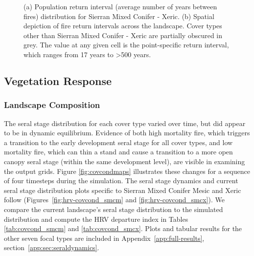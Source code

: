 \begin{figure}[!htbp]
  \centering
  \caption{(a) Population return interval (average number of years between fires) distribution for Sierran Mixed Conifer - Xeric.  (b) Spatial depiction of fire return intervals across the landscape. Cover types other than Sierran Mixed Conifer - Xeric are partially obscured in grey. The value at any given cell is the point-specific return interval, which ranges from 17 years to \textgreater 500 years.}
\label{fig:preturn_smcx}
\end{figure}

\clearpage



\subsection{Vegetation Response}
\label{subsec:HRVvegresponse}


\subsubsection{Landscape Composition} 

The seral stage distribution for each cover type varied over time, but did appear to be in dynamic equilibrium. Evidence of both high mortality fire, which triggers a transition to the early development seral stage for all cover types, and low mortality fire, which can thin a stand and cause a transition to a more open canopy seral stage (within the same development level), are visible in examining the output grids. Figure \ref{fig:covcondmaps} illustrates these changes for a sequence of four timesteps during the simulation. The seral stage dynamics and current seral stage distribution plots specific to Sierran Mixed Conifer Mesic and Xeric follow (Figures~\ref{fig:hrv-covcond_smcm} and \ref{fig:hrv-covcond_smcx}). We compare the current landscape's seral stage distribution to the simulated distribution and compute the HRV departure index in Tables \ref{tab:covcond_smcm} and \ref{tab:covcond_smcx}. Plots and tabular results for the other seven focal types are included in Appendix~\ref{app:full-results}, section~\ref{app:sec:seraldynamics}.

